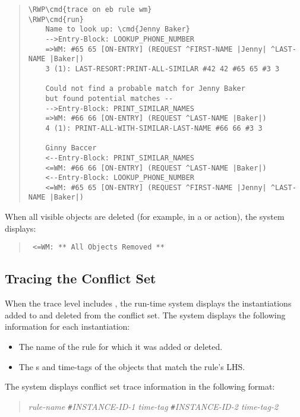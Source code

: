\begin{quote}
\begin{Verbatim}[commandchars=\\\{\}]
\RWP\cmd{trace on eb rule wm}
\RWP\cmd{run}
    Name to look up: \cmd{Jenny Baker}
    -->Entry-Block: LOOKUP_PHONE_NUMBER
    =>WM: #65 65 [ON-ENTRY] (REQUEST ^FIRST-NAME |Jenny| ^LAST-NAME |Baker|)
    3 (1): LAST-RESORT:PRINT-ALL-SIMILAR #42 42 #65 65 #3 3

    Could not find a probable match for Jenny Baker
    but found potential matches --
    -->Entry-Block: PRINT_SIMILAR_NAMES
    =>WM: #66 66 [ON-ENTRY] (REQUEST ^LAST-NAME |Baker|)
    4 (1): PRINT-ALL-WITH-SIMILAR-LAST-NAME #66 66 #3 3

    Ginny Baccer
    <--Entry-Block: PRINT_SIMILAR_NAMES
    <=WM: #66 66 [ON-ENTRY] (REQUEST ^LAST-NAME |Baker|)
    <--Entry-Block: LOOKUP_PHONE_NUMBER
    <=WM: #65 65 [ON-ENTRY] (REQUEST ^FIRST-NAME |Jenny| ^LAST-NAME |Baker|)
\end{Verbatim}
\end{quote}

When all visible objects are deleted (for example, in a
 or  action), the system displays:

\begin{quote}
\begin{verbatim}
 <=WM: ** All Objects Removed **
\end{verbatim}
\end{quote}

\subsection{Tracing the Conflict Set}

When the trace level includes , the run-time system displays
the instantiations added to and deleted from the conflict set.  The
system displays the following information for each instantiation:

\begin{itemize}
\item The name of the rule for which it was added or deleted.
\item The s and time-tags of the objects that match
  the rule's LHS.
\end{itemize}

The system displays conflict set trace information in the following
format:

\begin{quote}
  \it{rule-name} \verb|#|\it{INSTANCE-ID-1} \it{time-tag}
  \verb|#|\it{INSTANCE-ID-2} \it{time-tag-2}
\end{quote}

